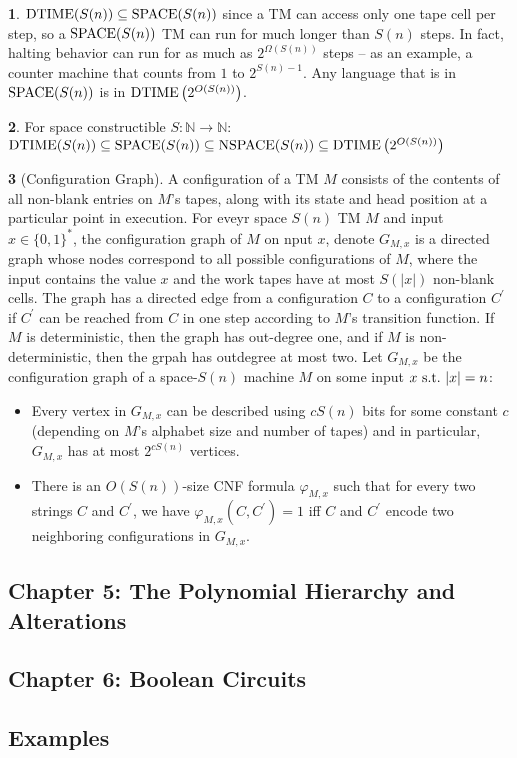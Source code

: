 \documentclass[10pt]{article}
\theoremstyle{definition}
\newtheorem{note}{}[section]
\begin{document}
\begin{note}
  $\mathrm{DTIME}(S(n)) \subseteq \mathrm{SPACE}(S(n))$ since a TM can access only one
  tape cell per step, so a $\mathrm{SPACE}(S(n))$ TM can run for much longer than
  $S(n)$ steps.
  In fact, halting behavior can run for as much as $2^{\Omega (S(n))}$ steps
  -- as an example, a counter machine that counts from $1$ to
  $2^{S(n) - 1}$.
  Any language that is in $\mathrm{SPACE}(S(n))$ is
  in $\mathrm{DTIME}\left(2^{O(S(n))}\right)$.
\end{note}

\begin{note}
  For space constructible $S: \mathbb{N} \to \mathbb{N}$:
  $\mathrm{DTIME}(S(n)) \subseteq \mathrm{SPACE}(S(n)) \subseteq \mathrm{NSPACE}(S(n))
  \subseteq \mathrm{DTIME}\left(2^{O(S(n))}\right)$
\end{note}

\begin{note}[Configuration Graph]
  A configuration of a TM $M$ consists of the contents of all non-blank
  entries on $M$'s tapes, along with its state and head position at a
  particular point in execution.
  For eveyr space $S(n)$ TM $M$ and input $x \in \{0, 1\}^\ast$, the
  configuration graph of $M$ on nput $x$, denote $G_{M, x}$ is a directed
  graph whose nodes correspond to all possible configurations of $M$, where
  the input contains the value $x$ and the work tapes have at most $S(|x|)$
  non-blank cells.
  The graph has a directed edge from a configuration $C$ to a configuration
  $C^\prime$ if $C^\prime$ can be reached from $C$ in one step according
  to $M$'s transition function.
  If $M$ is deterministic, then the graph has out-degree one, and if $M$
  is non-deterministic, then the grpah has outdegree at most two.
  Let $G_{M, x}$ be the configuration graph of a space-$S(n)$ machine $M$ on
  some input $x \mathrm{\ s.t.\ } |x| = n$:
  \begin{itemize}
    \item
      Every vertex in $G_{M, x}$ can be described using $cS(n)$ bits for some
      constant $c$ (depending on $M$'s alphabet size and number of tapes) and
      in particular, $G_{M, x}$ has at most $2^{cS(n)}$ vertices.

    \item
      There is an $O(S(n))$-size CNF formula $\varphi_{M, x}$ such that
      for every two strings $C$ and $C^\prime$, we have
      $\varphi_{M, x} (C, C^\prime) = 1$ iff $C$ and $C^\prime$ encode two
      neighboring configurations in $G_{M, x}$.
  \end{itemize}
\end{note}


\subsection*{Chapter 5: The Polynomial Hierarchy and Alterations}



\subsection*{Chapter 6: Boolean Circuits}


\subsection*{Examples}
\end{document}
